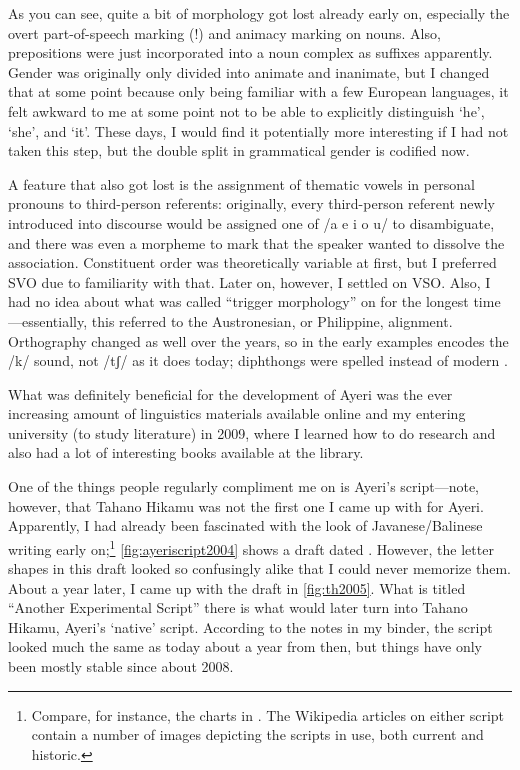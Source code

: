 As you can see, quite a bit of morphology got lost already early on, especially
the overt part-of-speech marking (!) and animacy marking on nouns. Also,
prepositions were just incorporated into a noun complex as suffixes apparently.
Gender was originally only divided into animate and inanimate, but I changed
that at some point because only being familiar with a few European languages,
it felt awkward to me at some point not to be able to explicitly distinguish
`he', `she', and `it'. These days, I would find it potentially more interesting
if I had not taken this step, but the double split in grammatical gender is
codified now.

A feature that also got lost is the assignment of thematic vowels in personal
pronouns to third-person referents: originally, every third-person referent
newly introduced into discourse would be assigned one of /a e i o u/ to
disambiguate, and there was even a morpheme to mark that the speaker wanted to
dissolve the association. Constituent order was theoretically variable at
first, but I preferred SVO due to familiarity with that. Later on, however, I
settled on VSO. Also, I had no idea about what was called ``trigger
morphology'' on  for the longest time---essentially, this
referred to the Austronesian, or Philippine, alignment. Orthography changed as
well over the years, so  in the early examples encodes the /k/ sound,
not /tʃ/ as it does today; diphthongs were spelled  instead of modern
.

What was definitely beneficial for the development of Ayeri was the ever 
increasing amount of linguistics materials available online and my entering 
university (to study literature) in 2009, where I learned how to do research 
and also had a lot of interesting books available at the library.

One of the things people regularly compliment me on is Ayeri's script---note,
however, that Tahano Hikamu was not the first one I came
up with for Ayeri. Apparently, I had already been fascinated with the look of
Javanese/Balinese writing early on;\footnote{Compare, for instance, the charts
in \citet{kuipersmcdermott1996}. The Wikipedia articles on either script
contain a number of images depicting the scripts in use, both current and
historic.} \autoref{fig:ayeriscript2004} shows a draft dated
. However, the letter shapes in this draft looked so
confusingly alike that I could never memorize them. About a year later, I came
up with the draft in \autoref{fig:th2005}. What is titled ``Another
Experimental Script'' there is what would later turn into Tahano Hikamu,
Ayeri's `native' script. According to the notes in my binder, the script
looked much the same as today about a year from then, but things have only been
mostly stable since about 2008.

